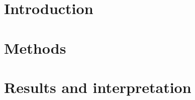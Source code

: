\documentclass[oneside,12pt,final]{sty/ucthesis-CA2012}
\begin{document}
\begin{frontmatter}
	
	\maketitle
	\approvalpage
	\copyrightpage
	
	
	\tableofcontents
\end{frontmatter}

\begin{mainmatter}

\pagestyle{fancy}
\renewcommand{\chaptermark}[1]{\markboth{{\sf #1 \hspace*{\fill} Chapter~\thechapter}}{} }
\renewcommand{\sectionmark}[1]{\markright{ {\sf Section~\thesection \hspace*{\fill} #1 }}}
\fancyhf{}

\makeatletter \if@twoside \fancyhead[LO]{\small \rightmark} \fancyhead[RE]{\small\leftmark} \else \fancyhead[LO]{\small\leftmark}
\fancyhead[RE]{\small\rightmark} \fi

\def\cleardoublepage{\clearpage\if@openright \ifodd\c@page\else
  \hbox{}
  \vspace*{\fill}
  \begin{center}
    This page intentionally left blank
  \end{center}
  \vspace{\fill}
  \thispagestyle{plain}
  \newpage
  \fi \fi}
\makeatother
\fancyfoot[c]{\textrm{\textup{\thepage}}} %
\fancyfoot[C]{\thepage}
\renewcommand{\headrulewidth}{0.4pt}

 { \fancyhf{} \fancyfoot[C]{\thepage}
\renewcommand{\headrulewidth}{0pt}
\renewcommand{\footrulewidth}{0pt}}

\chapter{Introduction}


\chapter{Methods}


\chapter{Results and interpretation}


\appendix


\end{mainmatter}
\ssp


\end{document}
